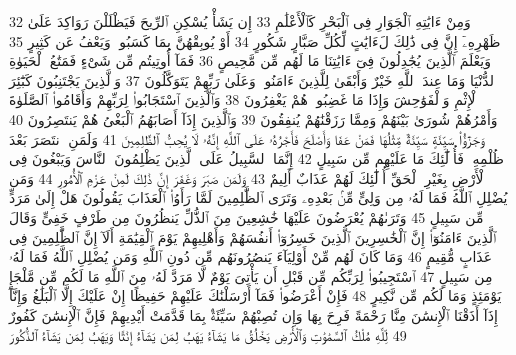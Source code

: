 {\tiny\colorbox{cl_aya}{32}} وَمِنْ ءَايَٰتِهِ ٱلْجَوَارِ فِى ٱلْبَحْرِ كَٱلْأَعْلَٰمِ
{\tiny\colorbox{cl_aya}{33}} إِن يَشَأْ يُسْكِنِ ٱلرِّيحَ فَيَظْلَلْنَ رَوَاكِدَ عَلَىٰ ظَهْرِهِۦٓ إِنَّ فِى ذَٰلِكَ لَءَايَٰتٍ لِّكُلِّ صَبَّارٍ شَكُورٍ
{\tiny\colorbox{cl_aya}{34}} أَوْ يُوبِقْهُنَّ بِمَا كَسَبُوا۟ وَيَعْفُ عَن كَثِيرٍ
{\tiny\colorbox{cl_aya}{35}} وَيَعْلَمَ ٱلَّذِينَ يُجَٰدِلُونَ فِىٓ ءَايَٰتِنَا مَا لَهُم مِّن مَّحِيصٍ
{\tiny\colorbox{cl_aya}{36}} فَمَآ أُوتِيتُم مِّن شَىْءٍ فَمَتَٰعُ ٱلْحَيَوٰةِ ٱلدُّنْيَا وَمَا عِندَ ٱللَّهِ خَيْرٌ وَأَبْقَىٰ لِلَّذِينَ ءَامَنُوا۟ وَعَلَىٰ رَبِّهِمْ يَتَوَكَّلُونَ
{\tiny\colorbox{cl_aya}{37}} وَٱلَّذِينَ يَجْتَنِبُونَ كَبَٰٓئِرَ ٱلْإِثْمِ وَٱلْفَوَٰحِشَ وَإِذَا مَا غَضِبُوا۟ هُمْ يَغْفِرُونَ
{\tiny\colorbox{cl_aya}{38}} وَٱلَّذِينَ ٱسْتَجَابُوا۟ لِرَبِّهِمْ وَأَقَامُوا۟ ٱلصَّلَوٰةَ وَأَمْرُهُمْ شُورَىٰ بَيْنَهُمْ وَمِمَّا رَزَقْنَٰهُمْ يُنفِقُونَ
{\tiny\colorbox{cl_aya}{39}} وَٱلَّذِينَ إِذَآ أَصَابَهُمُ ٱلْبَغْىُ هُمْ يَنتَصِرُونَ
{\tiny\colorbox{cl_aya}{40}} وَجَزَٰٓؤُا۟ سَيِّئَةٍ سَيِّئَةٌ مِّثْلُهَا فَمَنْ عَفَا وَأَصْلَحَ فَأَجْرُهُۥ عَلَى ٱللَّهِ إِنَّهُۥ لَا يُحِبُّ ٱلظَّٰلِمِينَ
{\tiny\colorbox{cl_aya}{41}} وَلَمَنِ ٱنتَصَرَ بَعْدَ ظُلْمِهِۦ فَأُو۟لَٰٓئِكَ مَا عَلَيْهِم مِّن سَبِيلٍ
{\tiny\colorbox{cl_aya}{42}} إِنَّمَا ٱلسَّبِيلُ عَلَى ٱلَّذِينَ يَظْلِمُونَ ٱلنَّاسَ وَيَبْغُونَ فِى ٱلْأَرْضِ بِغَيْرِ ٱلْحَقِّ أُو۟لَٰٓئِكَ لَهُمْ عَذَابٌ أَلِيمٌ
{\tiny\colorbox{cl_aya}{43}} وَلَمَن صَبَرَ وَغَفَرَ إِنَّ ذَٰلِكَ لَمِنْ عَزْمِ ٱلْأُمُورِ
{\tiny\colorbox{cl_aya}{44}} وَمَن يُضْلِلِ ٱللَّهُ فَمَا لَهُۥ مِن وَلِىٍّ مِّنۢ بَعْدِهِۦ وَتَرَى ٱلظَّٰلِمِينَ لَمَّا رَأَوُا۟ ٱلْعَذَابَ يَقُولُونَ هَلْ إِلَىٰ مَرَدٍّ مِّن سَبِيلٍ
{\tiny\colorbox{cl_aya}{45}} وَتَرَىٰهُمْ يُعْرَضُونَ عَلَيْهَا خَٰشِعِينَ مِنَ ٱلذُّلِّ يَنظُرُونَ مِن طَرْفٍ خَفِىٍّ وَقَالَ ٱلَّذِينَ ءَامَنُوٓا۟ إِنَّ ٱلْخَٰسِرِينَ ٱلَّذِينَ خَسِرُوٓا۟ أَنفُسَهُمْ وَأَهْلِيهِمْ يَوْمَ ٱلْقِيَٰمَةِ أَلَآ إِنَّ ٱلظَّٰلِمِينَ فِى عَذَابٍ مُّقِيمٍ
{\tiny\colorbox{cl_aya}{46}} وَمَا كَانَ لَهُم مِّنْ أَوْلِيَآءَ يَنصُرُونَهُم مِّن دُونِ ٱللَّهِ وَمَن يُضْلِلِ ٱللَّهُ فَمَا لَهُۥ مِن سَبِيلٍ
{\tiny\colorbox{cl_aya}{47}} ٱسْتَجِيبُوا۟ لِرَبِّكُم مِّن قَبْلِ أَن يَأْتِىَ يَوْمٌ لَّا مَرَدَّ لَهُۥ مِنَ ٱللَّهِ مَا لَكُم مِّن مَّلْجَإٍ يَوْمَئِذٍ وَمَا لَكُم مِّن نَّكِيرٍ
{\tiny\colorbox{cl_aya}{48}} فَإِنْ أَعْرَضُوا۟ فَمَآ أَرْسَلْنَٰكَ عَلَيْهِمْ حَفِيظًا إِنْ عَلَيْكَ إِلَّا ٱلْبَلَٰغُ وَإِنَّآ إِذَآ أَذَقْنَا ٱلْإِنسَٰنَ مِنَّا رَحْمَةً فَرِحَ بِهَا وَإِن تُصِبْهُمْ سَيِّئَةٌۢ بِمَا قَدَّمَتْ أَيْدِيهِمْ فَإِنَّ ٱلْإِنسَٰنَ كَفُورٌ
{\tiny\colorbox{cl_aya}{49}} لِّلَّهِ مُلْكُ ٱلسَّمَٰوَٰتِ وَٱلْأَرْضِ يَخْلُقُ مَا يَشَآءُ يَهَبُ لِمَن يَشَآءُ إِنَٰثًا وَيَهَبُ لِمَن يَشَآءُ ٱلذُّكُورَ
